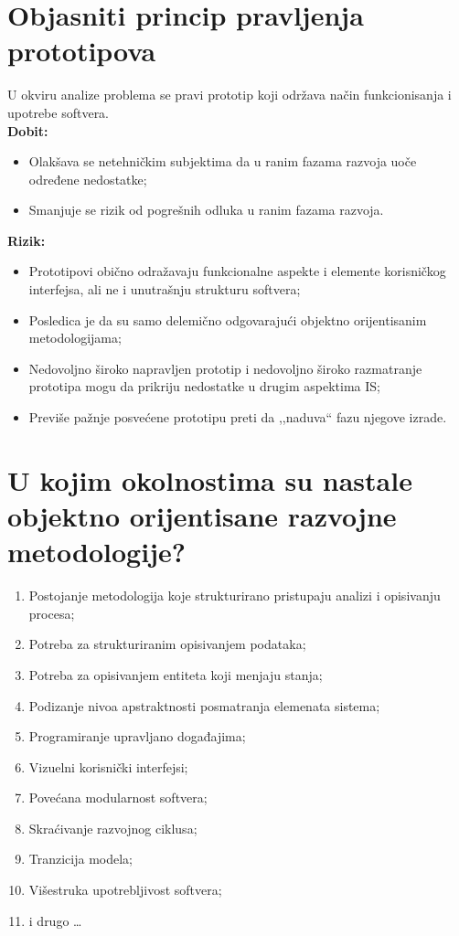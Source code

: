 \documentclass[a4paper]{article}
\begin{document}
\section{Objasniti princip pravljenja prototipova}
  U okviru analize problema se pravi prototip koji održava način funkcionisanja i upotrebe softvera.\\
  \textbf{Dobit:}
  \begin{itemize}
    \item Olakšava se netehničkim subjektima da u ranim fazama razvoja uoče određene nedostatke;
    \item Smanjuje se rizik od pogrešnih odluka u ranim fazama razvoja.
  \end{itemize}
  \textbf{Rizik:}
  \begin{itemize}
    \item Prototipovi obično odražavaju funkcionalne aspekte i elemente korisničkog interfejsa,   
          ali ne i unutrašnju strukturu softvera;
    \item Posledica je da su samo delemično odgovarajući objektno orijentisanim metodologijama;
    \item Nedovoljno široko napravljen prototip i nedovoljno široko razmatranje prototipa mogu da 
          prikriju nedostatke u drugim aspektima IS;
    \item Previše pažnje posvećene prototipu preti da ,,naduva`` fazu njegove izrade.
  \end{itemize}

\section{U kojim okolnostima su nastale objektno orijentisane razvojne metodologije?}
  \begin{enumerate}
    \item Postojanje metodologija koje strukturirano pristupaju analizi i opisivanju procesa;
    \item Potreba za strukturiranim opisivanjem podataka;
    \item Potreba za opisivanjem entiteta koji menjaju stanja;
    \item Podizanje nivoa apstraktnosti posmatranja elemenata sistema;
    \item Programiranje upravljano događajima;
    \item Vizuelni korisnički interfejsi;
    \item Povećana modularnost softvera;
    \item Skraćivanje razvojnog ciklusa;
    \item Tranzicija modela;
    \item Višestruka upotrebljivost softvera;
    \item i drugo \dots
  \end{enumerate}
\end{document}
